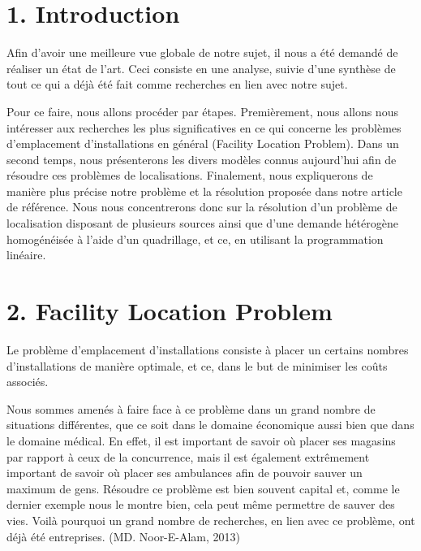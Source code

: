  \chapter*{1. Introduction}
\bigskip
 
Afin d'avoir une meilleure vue globale de notre sujet, il nous a été demandé de réaliser un état de l'art. Ceci consiste en une analyse, suivie d'une synthèse de tout ce qui a déjà été fait comme recherches en lien avec notre sujet.

\bigskip

Pour ce faire, nous allons procéder par étapes. Premièrement, nous allons nous intéresser aux recherches les plus significatives en ce qui concerne les problèmes d'emplacement d'installations en général (Facility Location Problem). Dans un second temps, nous présenterons les divers modèles connus aujourd'hui afin de résoudre ces problèmes de localisations. Finalement, nous expliquerons de manière plus précise notre problème et la résolution proposée dans notre article de référence. Nous nous concentrerons donc sur la résolution d'un problème de localisation disposant de plusieurs sources ainsi que d'une demande hétérogène homogénéisée à l'aide d'un quadrillage, et ce, en utilisant la programmation linéaire.
 
\clearpage
 
\chapter*{2. Facility Location Problem}
\bigskip

Le problème d'emplacement d'installations consiste à placer un certains nombres d'installations de manière optimale, et ce, dans le but de minimiser les coûts associés.

\bigskip

Nous sommes amenés à faire face à ce problème dans un grand nombre de situations différentes, que ce soit dans le domaine économique aussi bien que dans le domaine médical. En effet, il est important de savoir où placer ses magasins par rapport à ceux de la concurrence, mais il est également extrêmement important de savoir où placer ses ambulances afin de pouvoir sauver un maximum de gens. Résoudre ce problème est bien souvent capital et, comme le dernier exemple nous le montre bien, cela peut même permettre de sauver des vies. Voilà pourquoi un grand nombre de recherches, en lien avec ce problème, ont déjà été entreprises. (MD. Noor-E-Alam, 2013)

\bigskip


